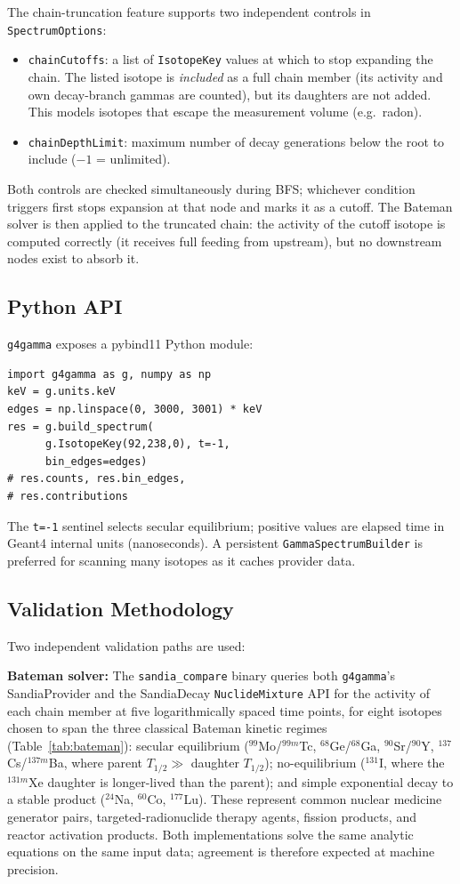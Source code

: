 \documentclass[journal]{IEEEtran}
\begin{document}
The chain-truncation feature supports two independent controls in
\texttt{SpectrumOptions}:
\begin{itemize}
  \item \texttt{chainCutoffs}: a list of \texttt{IsotopeKey} values at which
        to stop expanding the chain. The listed isotope is \emph{included}
        as a full chain member (its activity and own decay-branch gammas are
        counted), but its daughters are not added. This models isotopes that
        escape the measurement volume (e.g.\ radon).
  \item \texttt{chainDepthLimit}: maximum number of decay generations below the
        root to include ($-1$ = unlimited).
\end{itemize}
Both controls are checked simultaneously during BFS; whichever condition triggers
first stops expansion at that node and marks it as a cutoff.
The Bateman solver is then applied to the truncated chain: the activity of the
cutoff isotope is computed correctly (it receives full feeding from upstream),
but no downstream nodes exist to absorb it.

\subsection{Python API}

\texttt{g4gamma} exposes a pybind11 Python module:
\begin{verbatim}
import g4gamma as g, numpy as np
keV = g.units.keV
edges = np.linspace(0, 3000, 3001) * keV
res = g.build_spectrum(
      g.IsotopeKey(92,238,0), t=-1,
      bin_edges=edges)
# res.counts, res.bin_edges,
# res.contributions
\end{verbatim}
The \texttt{t=-1} sentinel selects secular equilibrium; positive values are
elapsed time in Geant4 internal units (nanoseconds).
A persistent \texttt{GammaSpectrumBuilder} is preferred for scanning many
isotopes as it caches provider data.

\subsection{Validation Methodology}

Two independent validation paths are used:

\textbf{Bateman solver:}  The \texttt{sandia\_compare} binary queries both
\texttt{g4gamma}'s SandiaProvider and the SandiaDecay \texttt{NuclideMixture}
API for the activity of each chain member at five logarithmically spaced time
points, for eight isotopes chosen to span the three classical Bateman kinetic
regimes (Table~\ref{tab:bateman}): secular equilibrium ($^{99}$Mo/$^{99m}$Tc,
$^{68}$Ge/$^{68}$Ga, $^{90}$Sr/$^{90}$Y, $^{137}$Cs/$^{137m}$Ba, where parent
$T_{1/2} \gg$ daughter $T_{1/2}$); no-equilibrium ($^{131}$I, where the
$^{131m}$Xe daughter is longer-lived than the parent); and simple exponential
decay to a stable product ($^{24}$Na, $^{60}$Co, $^{177}$Lu).
These represent common nuclear medicine generator pairs, targeted-radionuclide
therapy agents, fission products, and reactor activation products.
Both implementations solve the same analytic equations on the same input data;
agreement is therefore expected at machine precision.
\end{document}
